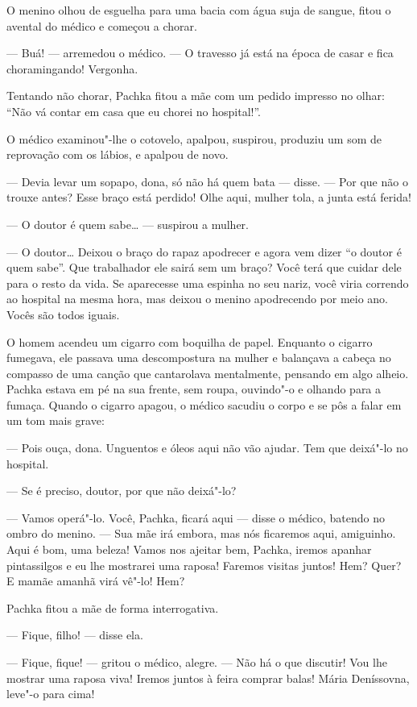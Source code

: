 O menino olhou de esguelha para uma bacia com água suja de sangue, fitou o
avental do médico e começou a chorar.

--- Buá! --- arremedou o médico. --- O travesso já está na época de
casar e fica choramingando! Vergonha.

Tentando não chorar, Pachka fitou a mãe com um pedido impresso no olhar:
``Não vá contar em casa que eu chorei no hospital!''.

O médico examinou"-lhe o cotovelo, apalpou, suspirou, produziu um som de reprovação com os lábios, e apalpou de novo.

--- Devia levar um sopapo, dona, só não há quem bata --- disse. --- Por
que não o trouxe antes? Esse braço está perdido! Olhe aqui, mulher tola,
a junta está ferida!

--- O doutor é quem sabe\ldots{} --- suspirou a mulher.

--- O doutor\ldots{} Deixou o braço do rapaz apodrecer e agora vem dizer ``o
doutor é quem sabe''. Que trabalhador ele sairá sem um braço? Você terá
que cuidar dele para o resto da vida. Se aparecesse uma espinha no seu
nariz, você viria correndo ao hospital na mesma hora, mas deixou o
menino apodrecendo por meio ano. Vocês são todos iguais.

O homem acendeu um cigarro com boquilha de papel. Enquanto o
cigarro fumegava, ele passava uma descompostura na mulher e balançava a
cabeça no compasso de uma canção que cantarolava mentalmente, pensando
em algo alheio. Pachka estava em pé na sua frente, sem
roupa, ouvindo"-o e olhando para a fumaça. Quando o cigarro apagou, o
médico sacudiu o corpo e se pôs a falar em um tom mais grave:

--- Pois ouça, dona. Unguentos e óleos aqui não vão ajudar. Tem que
deixá"-lo no hospital.

--- Se é preciso, doutor, por que não deixá"-lo?

--- Vamos operá"-lo. Você, Pachka, ficará aqui --- disse o médico,
batendo no ombro do menino. --- Sua mãe irá embora, mas nós ficaremos
aqui, amiguinho. Aqui é bom, uma beleza! Vamos nos ajeitar bem, Pachka,
iremos apanhar pintassilgos e eu lhe mostrarei uma raposa! Faremos
visitas juntos! Hem? Quer? E mamãe amanhã virá vê"-lo! Hem?

Pachka fitou a mãe de forma interrogativa.

--- Fique, filho! --- disse ela.

--- Fique, fique! --- gritou o médico, alegre. --- Não há o que
discutir! Vou lhe mostrar uma raposa viva! Iremos juntos à feira comprar
balas! Mária Deníssovna, leve"-o para cima!

